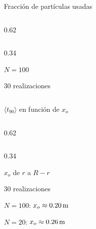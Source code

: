 \fi


\begin{frame}{Fracción de partículas usadas}
  \begin{cols}
    \begin{column}{0.62\textwidth}
    \end{column}
    \begin{column}{0.34\textwidth}
      \begin{parametros}
        \item $N = 100$
        \item $30$ realizaciones
      \end{parametros}
    \end{column}
  \end{cols}
\end{frame}

\begin{frame}{$\langle t_{90}\rangle$ en función de $x_o$}
  \begin{cols}
    \begin{column}{0.62\textwidth}
    \end{column}
    \begin{column}{0.34\textwidth}
      \begin{parametros}
        \item $x_o$ de $r$ a $R - r$
        \item $30$ realizaciones
      \end{parametros}
      \begin{resultado}
        \item $N = 100$: $x_o \approx 0.20\,\mathrm{m}$
        \item $N = 20$: $x_o \approx 0.26\,\mathrm{m}$
      \end{resultado}
    \end{column}
  \end{cols}
\end{frame}
